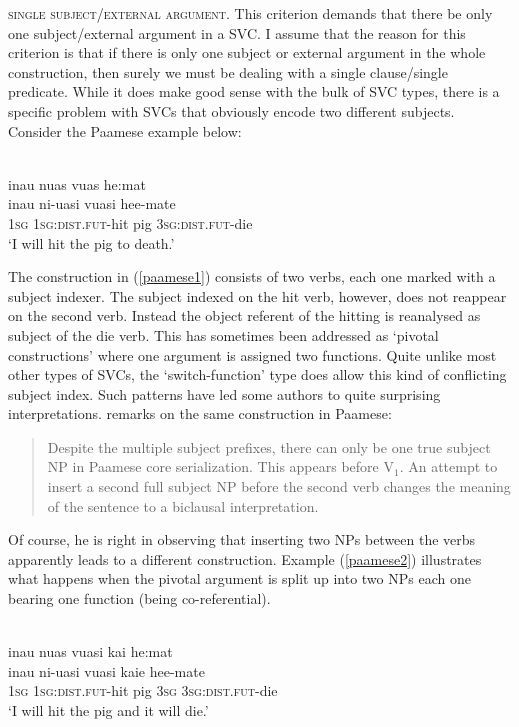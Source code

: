 \textsc{single subject/external argument}. This criterion demands that there be only one subject/external argument in a SVC. I assume that the reason for this criterion is that if there is only one subject or external argument in the whole construction, then surely we must be dealing with a single clause/single predicate. While it does make good sense with the bulk of SVC types, there is a specific problem with SVCs that obviously encode two different subjects. Consider the Paamese example below:

\ea \label{paamese1}
\\
\glll inau nuas vuas he:mat \\
inau ni-uasi vuasi hee-mate \\
\textsc{1}\textsc{sg} \textsc{1}\textsc{sg}:\textsc{dist}.\textsc{fut}-hit pig \textsc{3}\textsc{sg}:\textsc{dist}.\textsc{fut}-die \\
\glft `I will hit the pig to death.' \\ 
\z

The construction in (\ref{paamese1}) consists of two verbs, each one marked with a subject indexer. The subject indexed on the hit verb, however, does not reappear on the second verb. Instead the object referent of the hitting is reanalysed as subject of the die verb. This has sometimes been addressed as `pivotal constructions' where one argument is assigned two functions. Quite unlike most other types of SVCs, the `switch-function' type does allow this kind of conflicting subject index. Such patterns have led some authors to quite surprising interpretations. \citet[292]{Durie1997} remarks on the same construction in Paamese: \begin{quote}Despite the multiple subject prefixes, there can only be one true subject NP in Paamese core serialization. This appears before V$_1$. An attempt to insert a second full subject NP before the second verb changes the meaning of the sentence to a biclausal interpretation.\end{quote}

Of course, he is right in observing that inserting two NPs between the verbs apparently leads to a different construction. Example (\ref{paamese2}) illustrates what happens when the pivotal argument is split up into two NPs each one bearing one function (being co-referential).

\ea \label{paamese2}
\\
\glll inau nuas vuasi kai he:mat \\
inau ni-uasi vuasi kaie hee-mate \\
\textsc{1}\textsc{sg} \textsc{1}\textsc{sg}:\textsc{dist}.\textsc{fut}-hit pig \textsc{3}\textsc{sg} \textsc{3}\textsc{sg}:\textsc{dist}.\textsc{fut}-die \\
\glft `I will hit the pig and it will die.'\\ 
\z

